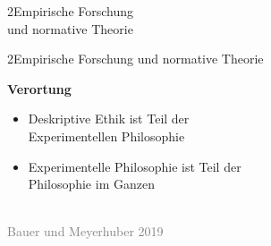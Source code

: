 \documentclass[xcolor=table,9pt,aspectratio=169]{beamer}
\begin{document}
\begin{frame}
\begin{overlayarea}{\textwidth}{0.81\paperheight}{
   \vspace*{11mm}
   \textcolor{uolblue}
   {2\hspace*{1em}Empirische Forschung\\\hspace*{1.5em}und normative Theorie}
}
\end{overlayarea}
\end{frame}


\begin{frame}{\vspace*{10mm}2\hspace*{1em}Empirische Forschung und normative Theorie}
\begin{multicols}{2}
   \textbf{Verortung}\\
   \medskip
   \begin{itemize}
      \item Deskriptive Ethik ist Teil der\\Experimentellen Philosophie
      \item Experimentelle Philosophie ist Teil der\\Philosophie im Ganzen
   \end{itemize}
   \vfill
   \begin{center}
      \\
      \textcolor{gray}{Bauer und Meyerhuber 2019}
   \end{center}
\end{multicols}
\end{frame}
\end{document}
